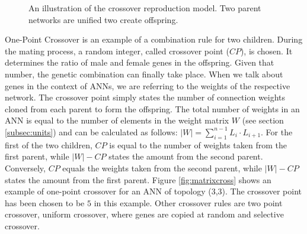 \documentclass[10pt,a4paper,DIV=11]{scrreprt}
\begin{document}
\begin{figure}[H]
	\centering
	\caption{An illustration of the crossover reproduction model. Two parent networks are unified two create offspring.}
	\label{fig:repro}
\end{figure}

One-Point Crossover is an example of a combination rule for two children. During the mating process, a random integer, called crossover point ($CP$),
is chosen. It determines the ratio of male and female genes in the offspring. Given that number, the genetic combination can finally take place.
When we talk about genes in the context of ANNs, we are referring to the weights of the respective network. The crossover point simply states the number 
of connection weights cloned from each parent to form the offspring. The total number of weights in an ANN is equal to the number of elements in the 
weight matrix $W$ (see section \ref{subsec:units}) and can be calculated as follows: $|W| = \sum^{n-1}_{i=1} L_i \cdot L_{i+1}$. 
For the first of the two children, $CP$ is equal to the number of weights taken from the first parent, while $|W|-CP$ states the amount from the 
second parent. Conversely, $CP$ equals the weights taken from the second parent, while $|W|-CP$ states the amount from the first parent. 
Figure \ref{fig:matrixcross} shows an example of one-point crossover for an ANN of topology (3,3). The crossover point has been chosen to be $5$ in 
this example. Other crossover rules are two point crossover, uniform crossover, where genes are copied at random \cite{UNIFORMCROSSOVER} and selective 
crossover\cite{SELECTCROSSOVER}.
\end{document}

